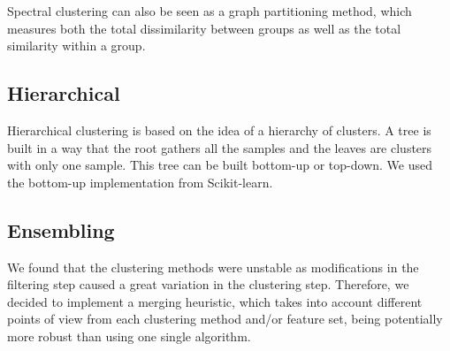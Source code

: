 \documentclass[a0,portrait]{a0poster}
\begin{document}
\begin{multicols}{2}
Spectral clustering can also be seen as a graph partitioning method, which measures both the total dissimilarity between groups 
as well as the total similarity within a group. %

\vspace{-0.4cm}
\subsection*{Hierarchical}
\vspace{-0.7cm}

Hierarchical clustering  is based on the idea of a hierarchy of clusters. A tree is built in a way that the root gathers all the samples and the leaves are clusters with only one sample. This tree can be built bottom-up or top-down. We used the bottom-up implementation from Scikit-learn.

\vspace{-0.4cm}
\subsection*{Ensembling}
\vspace{-0.7cm}

We found that the clustering methods were unstable as modifications in the filtering step caused a great variation in the clustering step.
Therefore, we decided to implement a merging heuristic, which takes into account different points of view from each clustering method and/or feature set,
being potentially more robust than using one single algorithm.



\end{multicols}
\end{document}
